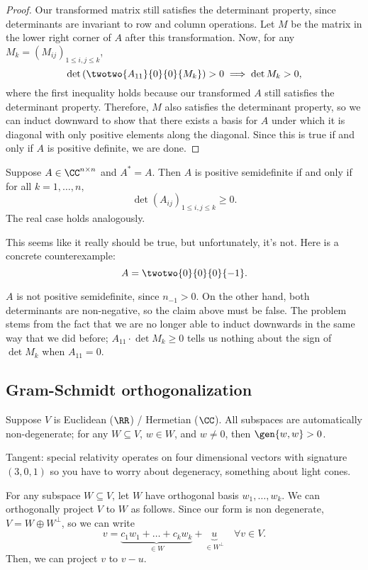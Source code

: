 \begin{proof}
Our transformed matrix still satisfies the determinant property, since determinants are invariant to row and column operations. Let $M$ be the matrix in the lower right corner of $A$ after this transformation. Now, for any $M_k = (M_{ij})_{1\leq i,j\leq k}$, 
\[\det \left(\twotwo{A_{11}}{0}{0}{M_k}\right) > 0 \implies \det M_k > 0,\]
where the first inequality holds because our transformed $A$ still satisfies the determinant property. Therefore, $M$ also satisfies the determinant property, so we can induct downward to show that there exists a basis for $A$ under which it is diagonal with only positive elements along the diagonal. Since this is true if and only if $A$ is positive definite, we are done. 
\end{proof}

\begin{misconception}
\mislabel 

Suppose $A\in \CC^{n\times n}$ and $A^* = A$. Then $A$ is positive semidefinite if and only if for all $k = 1,\hdots, n,$
\[\det (A_{ij})_{1\leq i,j\leq k} \geq 0.\]
The real case holds analogously.
\end{misconception}

This seems like it really should be true, but unfortunately, it's not. Here is a concrete counterexample: 
\[A = \twotwo{0}{0}{0}{-1}.\]

$A$ is not positive semidefinite, since $n_{-1} > 0$. On the other hand, both determinants are non-negative, so the claim above must be false. The problem stems from the fact that we are no longer able to induct downwards in the same way that we did before;  $A_{11}\cdot \det M_k\geq 0$ tells us nothing about the sign of $\det M_k$ when $A_{11} = 0$. 


\subsection{Gram-Schmidt orthogonalization}

Suppose $V$ is Euclidean ($\RR$) / Hermetian ($\CC$). All subspaces are automatically non-degenerate; for any $W\subseteq V$, $w\in W$, and $w\neq 0$, then $\gen{w,w} > 0$. 

Tangent: special relativity operates on four dimensional vectors with signature $(3,0,1)$ so you have to worry about degeneracy, something about light cones. 

For any subspace $W\subseteq V$, let $W$ have orthogonal basis $w_1, \hdots, w_k$. We can orthogonally project $V$ to $W$ as follows. Since our form is non degenerate, $V = W\oplus W^{\perp}$, so we can write
\[v = \underbrace{c_1w_1+\hdots + c_kw_k}_{\in W} + \underbrace{u}_{\in W^{\perp}} \quad \forall v\in V.\]
Then, we can project $v$ to $v-u$.

